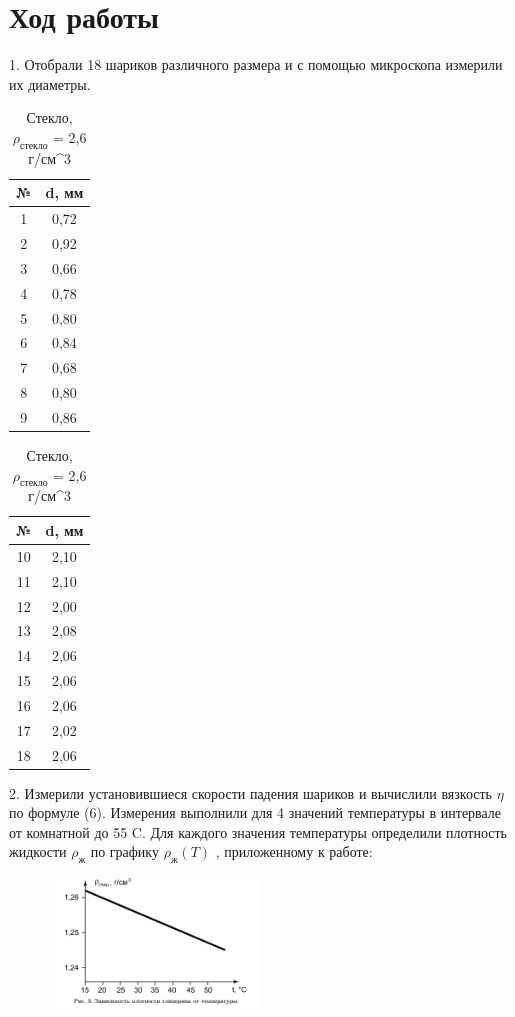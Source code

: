 \documentclass[a4paper]{article}
\begin{document}
	\section{Ход работы}
	1. Отобрали 18 шариков различного размера и с помощью микроскопа измерили их диаметры.
	\begin{table}[h]
		\parbox{.45\linewidth}{
			\centering
			\begin{tabular}{|c|c|} \hline
				№ & d, мм \\ \hline
				1 & 0,72 \\ \hline
				2 & 0,92 \\ \hline
				3 & 0,66 \\ \hline
				4 & 0,78 \\ \hline
				5 & 0,80 \\ \hline
				6 & 0,84 \\ \hline
				7 & 0,68 \\ \hline
				8 & 0,80 \\ \hline
				9 & 0,86 \\ \hline
			\end{tabular}
			\caption{Сталь, $\rho_\text{сталь}$ = 7,8 г/см^3 }
		}
		\hfill
		\parbox{.45\linewidth}{
			\centering
			\begin{tabular}{|c|c|} \hline
				№ & d, мм \\ \hline
				10 & 2,10 \\ \hline
				11 & 2,10 \\ \hline
				12 & 2,00 \\ \hline
				13 & 2,08 \\ \hline
				14 & 2,06 \\ \hline
				15 & 2,06 \\ \hline
				16 & 2,06 \\ \hline
				17 & 2,02 \\ \hline
				18 & 2,06 \\ \hline
			\end{tabular}
			\caption{Стекло, $\rho_\text{стекло}$ = 2,6  г/см^3 }
		}
	\end{table}
	
	
	2. Измерили установившиеся скорости падения шариков и вычислили вязкость $\eta$ по формуле (6).  Измерения выполнили для 4 значений температуры в интервале от комнатной до 55 \degres C. Для каждого значения температуры определили плотность жидкости $\rho_\text{ж}$ по графику $\rho_\text{ж}(T)$ , приложенному к работе:
	\begin{figure}[H!]
	\centering
	\includegraphics[width=0.5\textwidth]{226_ris3.png}
	\end{figure}
\end{document}
